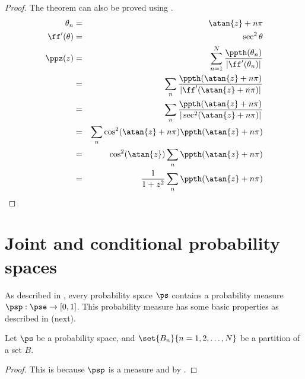 \begin{proof}
The theorem can also be proved using .
\begin{eqnarray*}
  \theta_n &=& \atan{z}+n\pi \\
  \ff'(\theta) &=& \sec^2 \theta    \\
  \ppz(z)
    &=& \sum_{n=1}^N \frac{\ppth(\theta_n)}{|\ff'(\theta_n)|}
  \\&=& \sum_n \frac{\ppth(\atan{z}+n\pi)}{|\ff'(\atan{z}+n\pi)|}
  \\&=& \sum_n \frac{\ppth(\atan{z}+n\pi)}{|\sec^2(\atan{z}+n\pi)|}
  \\&=& \sum_n \cos^2(\atan{z}+n\pi)  \ppth(\atan{z}+n\pi)
  \\&=& \cos^2(\atan{z}) \sum_n  \ppth(\atan{z}+n\pi)
  \\&=& \frac{1}{1+z^2}  \sum_n \ppth(\atan{z}+n\pi)
\end{eqnarray*}
\end{proof}




\section{Joint and conditional probability spaces}
As described in ,
every probability space $\ps$ contains a probability measure $\psp:\pse\to[0,1]$.
This probability measure has some basic properties as described in
 (next).
\begin{theorem}
\label{thm:P}
Let $\ps$ be a probability space,
and $\set{B_n}{n=1,2,\ldots,N}$ be a partition of a set $B$.
\end{theorem}
\begin{proof}
This is because $\psp$ is a measure and by .
\end{proof}



